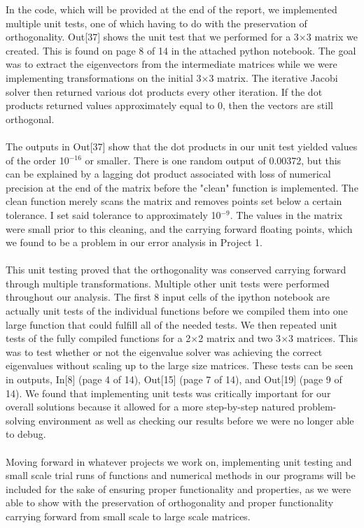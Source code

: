 \documentclass{article}
\begin{document}
In the code, which will be provided at the end of the report, we implemented multiple unit tests, one of which having to do with the preservation of orthogonality. Out[37] shows the unit test that we performed for a 3$\times$3 matrix we created. This is found on page 8 of 14 in the attached python notebook. The goal was to extract the eigenvectors from the intermediate matrices while we were implementing transformations on the initial 3$\times$3 matrix. The iterative Jacobi solver then returned various dot products every other iteration. If the dot products returned values approximately equal to 0, then the vectors are still orthogonal.\\
\\
The outputs in Out[37] show that the dot products in our unit test yielded values of the order 10$^{-16}$ or smaller. There is one random output of 0.00372, but this can be explained by a lagging dot product associated with loss of numerical precision at the end of the matrix before the "clean" function is implemented. The clean function merely scans the matrix and removes points set below a certain tolerance. I set said tolerance to approximately 10$^{-9}$. The values in the matrix were small prior to this cleaning, and the carrying forward floating points, which we found to be a problem in our error analysis in Project 1.\\
\\
This unit testing proved that the orthogonality was conserved carrying forward through multiple transformations. Multiple other unit tests were performed throughout our analysis. The first 8 input cells of the ipython notebook are actually unit tests of the individual functions before we compiled them into one large function that could fulfill all of the needed tests. We then repeated unit tests of the fully compiled functions for a 2$\times$2 matrix and two 3$\times$3 matrices. This was to test whether or not the eigenvalue solver was achieving the correct eigenvalues without scaling up to the large size matrices. These tests can be seen in outputs, In[8] (page 4 of 14), Out[15] (page 7 of 14), and Out[19] (page 9 of 14). We found that implementing unit tests was critically important for our overall solutions because it allowed for a more step-by-step natured problem-solving environment as well as checking our results before we were no longer able to debug.\\
\\
Moving forward in whatever projects we work on, implementing unit testing and small scale trial runs of functions and numerical methods in our programs will be included for the sake of ensuring proper functionality and properties, as we were able to show with the preservation of orthogonality and proper functionality carrying forward from small scale to large scale matrices.
\end{document}
